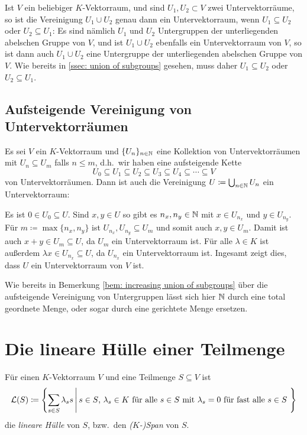 Ist $V$ ein beliebiger $K$-Vektorraum, und sind $U_1, U_2 \subset V$ zwei Untervektorräume, so ist die Vereinigung $U_1 \cup U_2$ genau dann ein Untervektorraum, wenn $U_1 \subseteq U_2$ oder $U_2 \subseteq U_1$: Es sind nämlich $U_1$ und $U_2$ Untergruppen der unterliegenden abelschen Gruppe von $V$, und ist $U_1 \cup U_2$ ebenfalls ein Untervektorraum von $V$, so ist dann auch $U_1 \cup U_2$ eine Untergruppe der unterliegenden abelschen Gruppe von $V$. Wie bereits in \ref{ssec: union of subgroups} gesehen, muss daher $U_1 \subseteq U_2$ oder $U_2 \subseteq U_1$.


\subsection{Aufsteigende Vereinigung von Untervektorräumen}
Es sei $V$ ein $K$-Vektorraum und $\{U_n\}_{n \in \mathbb{N}}$ eine Kollektion von Untervektorräumen mit $U_n \subseteq U_m$ falls $n \leq m$, d.h.\ wir haben eine aufsteigende Kette
\[
 U_0 \subseteq U_1 \subseteq U_2 \subseteq U_3 \subseteq U_4 \subseteq \dotsb \subseteq V
\]
von Untervektorräumen. Dann ist auch die Vereinigung $U \coloneqq \bigcup_{n \in \mathbb{N}} U_n$ ein Untervektorraum:

Es ist $0 \in U_0 \subseteq U$. Sind $x,y \in U$ so gibt es $n_x, n_y \in \mathbb{N}$ mit $x \in U_{n_x}$ und $y \in U_{n_y}$. Für $m \coloneqq \max\{n_x, n_y\}$ ist $U_{n_x}, U_{n_y} \subseteq U_m$ und somit auch $x,y \in U_m$. Damit ist auch $x+y \in U_m \subseteq U$, da $U_m$ ein Untervektorraum ist. Für alle $\lambda \in K$ ist außerdem $\lambda x \in U_{n_x} \subseteq U$, da $U_{n_x}$ ein Untervektorraum ist. Ingesamt zeigt dies, dass $U$ ein Untervektorraum von $V$ ist.


\begin{bem}
 Wie bereits in Bemerkung \ref{bem: increasing union of subgroups} über die aufsteigende Vereinigung von Untergruppen lässt sich hier $\mathbb{N}$ durch eine total geordnete Menge, oder sogar durch eine gerichtete Menge ersetzen.
\end{bem}





\section{Die lineare Hülle einer Teilmenge}
\begin{defi}
 Für einen $K$-Vektorraum $V$ und eine Teilmenge $S \subseteq V$ ist
 \[
  \mathcal{L}(S)
  \coloneqq
  \left\{
   \sum_{s \in S} \lambda_s s
   \,\middle|\,
   \text{$s \in S$, $\lambda_s \in K$ für alle $s \in S$ mit $\lambda_s = 0$ für fast alle $s \in S$ }
  \right\}
 \]
 die \emph{lineare Hülle} von $S$, bzw.\ den \emph{($K$-)Span} von $S$.
\end{defi}

